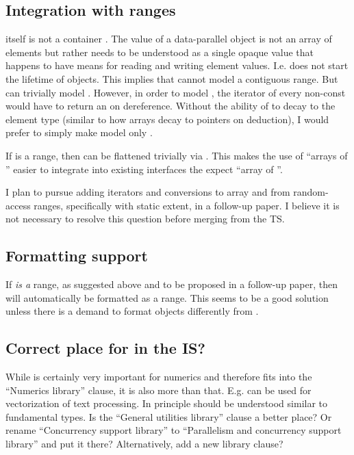 \subsection{Integration with ranges}\label{sec:ranges}
 itself is not a container \cite{P0851R0}.
The value of a data-parallel object is not an array of elements but rather needs to be understood as a single opaque value that happens to have means for reading and writing element values.
I.e.  does not start the lifetime of  objects.
This implies that  cannot model a contiguous range.
But  can trivially model .
However, in order to model , the iterator of every non-const
 would have to return an  on dereference.
Without the ability of  to decay to the element type
(similar to how arrays decay to pointers on deduction), I would prefer to
simply make  model only .

If  is a range, then \std{} can
be flattened trivially via .
This makes the use of ``arrays of '' easier to integrate into
existing interfaces the expect ``array of ''.

I plan to pursue adding iterators and conversions to array and from
random-access ranges, specifically  with static extent, in a
follow-up paper.
I believe it is not necessary to resolve this question before merging
 from the TS.

\subsection{Formatting support}\label{sec:formatting}
If  \emph{is a} range, as suggested above and to be proposed in a
follow-up paper, then  will automatically be formatted as a range.
This seems to be a good solution unless there is a demand to format 
objects differently from .

\subsection{Correct place for  in the IS?}

While  is certainly very important for numerics and therefore fits into the “Numerics library” clause, it is also more than that.
E.g.  can be used for vectorization of text processing.
In principle  should be understood similar to fundamental types.
Is the “General utilities library” clause a better place?
Or rename “Concurrency support library” to “Parallelism and concurrency support library” and put it there?
Alternatively, add a new library clause?

